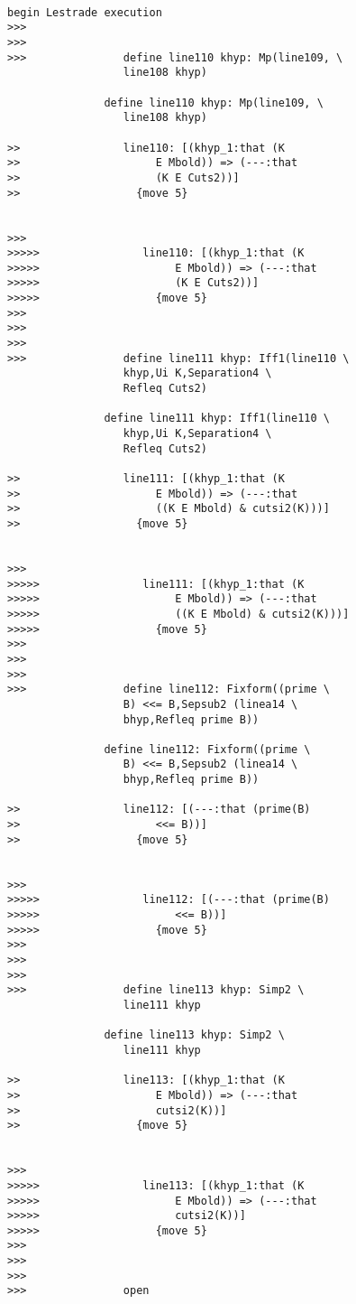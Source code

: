 \documentclass[12pt]{article}
\begin{document}
\begin{verbatim}

begin Lestrade execution
>>>
>>>
>>>               define line110 khyp: Mp(line109, \
                  line108 khyp)

               define line110 khyp: Mp(line109, \
                  line108 khyp)

>>                line110: [(khyp_1:that (K
>>                     E Mbold)) => (---:that
>>                     (K E Cuts2))]
>>                  {move 5}


>>>
>>>>>                line110: [(khyp_1:that (K
>>>>>                     E Mbold)) => (---:that
>>>>>                     (K E Cuts2))]
>>>>>                  {move 5}
>>>
>>>
>>>
>>>               define line111 khyp: Iff1(line110 \
                  khyp,Ui K,Separation4 \
                  Refleq Cuts2)

               define line111 khyp: Iff1(line110 \
                  khyp,Ui K,Separation4 \
                  Refleq Cuts2)

>>                line111: [(khyp_1:that (K
>>                     E Mbold)) => (---:that
>>                     ((K E Mbold) & cutsi2(K)))]
>>                  {move 5}


>>>
>>>>>                line111: [(khyp_1:that (K
>>>>>                     E Mbold)) => (---:that
>>>>>                     ((K E Mbold) & cutsi2(K)))]
>>>>>                  {move 5}
>>>
>>>
>>>
>>>               define line112: Fixform((prime \
                  B) <<= B,Sepsub2 (linea14 \
                  bhyp,Refleq prime B))

               define line112: Fixform((prime \
                  B) <<= B,Sepsub2 (linea14 \
                  bhyp,Refleq prime B))

>>                line112: [(---:that (prime(B)
>>                     <<= B))]
>>                  {move 5}


>>>
>>>>>                line112: [(---:that (prime(B)
>>>>>                     <<= B))]
>>>>>                  {move 5}
>>>
>>>
>>>
>>>               define line113 khyp: Simp2 \
                  line111 khyp

               define line113 khyp: Simp2 \
                  line111 khyp

>>                line113: [(khyp_1:that (K
>>                     E Mbold)) => (---:that
>>                     cutsi2(K))]
>>                  {move 5}


>>>
>>>>>                line113: [(khyp_1:that (K
>>>>>                     E Mbold)) => (---:that
>>>>>                     cutsi2(K))]
>>>>>                  {move 5}
>>>
>>>
>>>
>>>               open


\end{verbatim}
\end{document}
